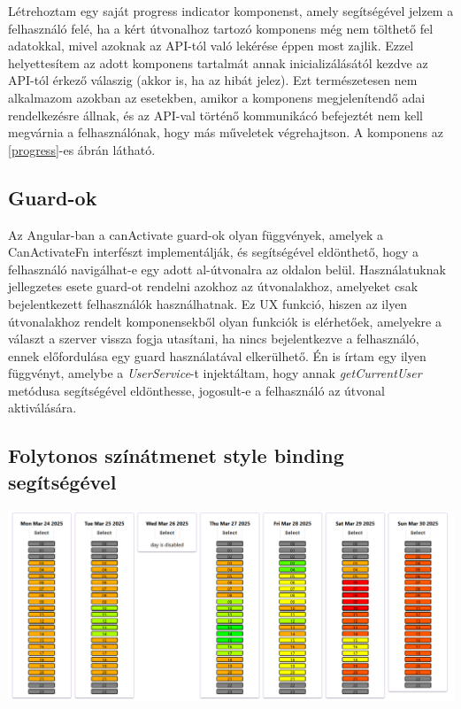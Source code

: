 \documentclass[a4paper,12pt]{report}
\theoremstyle{definition}
\theoremstyle{remark}
\begin{document}
Létrehoztam egy saját progress indicator komponenst, amely segítségével jelzem a felhasználó felé, ha a kért útvonalhoz tartozó komponens még nem tölthető fel adatokkal, mivel azoknak az API-tól való lekérése éppen most zajlik. Ezzel helyettesítem az adott komponens tartalmát annak inicializálásától kezdve az API-tól érkező válaszig (akkor is, ha az hibát jelez). Ezt természetesen nem alkalmazom azokban az esetekben, amikor a komponens megjelenítendő adai rendelkezésre állnak, és az API-val történő kommunikácó befejeztét nem kell megvárnia a felhasználónak, hogy más műveletek végrehajtson. A komponens az \ref{progress}-es ábrán látható.

	\subsection{Guard-ok}

Az Angular-ban a canActivate guard-ok olyan függvények, amelyek a CanActivateFn\cite{Guardwebsite} interfészt implementálják, és segítségével eldönthető, hogy a felhasználó navigálhat-e egy adott al-útvonalra az oldalon belül. Használatuknak jellegzetes esete guard-ot rendelni azokhoz az útvonalakhoz, amelyeket csak bejelentkezett felhasználók használhatnak. Ez UX funkció, hiszen az ilyen útvonalakhoz rendelt komponensekből olyan funkciók is elérhetőek, amelyekre a választ a szerver vissza fogja utasítani, ha nincs bejelentkezve a felhasználó, ennek előfordulása egy guard használatával elkerülhető. Én is írtam egy ilyen függvényt, amelybe a  \textit{UserService}-t injektáltam, hogy annak  \textit{getCurrentUser} metódusa segítségével eldönthesse, jogosult-e a felhasználó az útvonal aktiválására.

	\subsection{Folytonos színátmenet style binding segítségével}

\begin{center}
\includegraphics[width=160mm]{week_view}
\captionsetup{width=0.8\linewidth}
\label{week_view}
\end{center}
\end{document}
